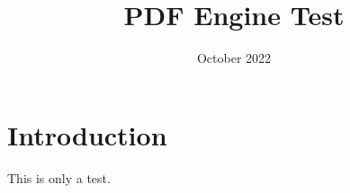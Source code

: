 \documentclass{article}
\title{PDF Engine Test}
\author{\VAR{name}}
\date{October 2022}
\begin{document}
\maketitle

\section{Introduction}
\par
This is only a test.
\end{document}
